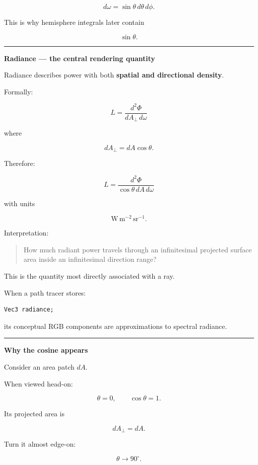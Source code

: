 \[
d\omega
=
\sin\theta\,d\theta\,d\phi.
\]

This is why hemisphere integrals later contain

\[
\sin\theta.
\]

\begin{center}\rule{0.5\linewidth}{0.5pt}\end{center}

\textbf{Radiance --- the central rendering quantity}

Radiance describes power with both \textbf{spatial and directional density}.

Formally:

\[
\boxed{
L=
\frac{d^2\Phi}
{dA_\perp\,d\omega}
}
\]

where

\[
dA_\perp
=
dA\cos\theta.
\]

Therefore:

\[
\boxed{
L=
\frac{d^2\Phi}
{\cos\theta\,dA\,d\omega}
}
\]

with units

\[
\mathrm{W\,m^{-2}\,sr^{-1}}.
\]

Interpretation:

\begin{quote}
How much radiant power travels through an infinitesimal projected surface area inside an infinitesimal direction range?
\end{quote}

This is the quantity most directly associated with a ray.

When a path tracer stores:

\begin{verbatim}
Vec3 radiance;
\end{verbatim}

its conceptual RGB components are approximations to spectral radiance.

\begin{center}\rule{0.5\linewidth}{0.5pt}\end{center}

\textbf{Why the cosine appears}

Consider an area patch \(dA\).

When viewed head-on:

\[
\theta=0,\qquad\cos\theta=1.
\]

Its projected area is

\[
dA_\perp=dA.
\]

Turn it almost edge-on:

\[
\theta\rightarrow90^\circ.
\]

